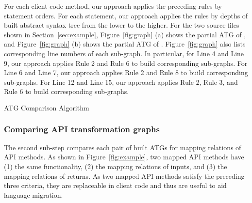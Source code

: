 For each client code method, our approach applies the preceding
rules by statement orders. For each statement, our approach applies
the rules by depths of built abstract syntax tree from the lower to
the higher. For the two source files shown in
Section~\ref{sec:example}, Figure~\ref{fig:graph} (a) shows the
partial ATG of , and Figure~\ref{fig:graph}
(b) shows the partial ATG of .
Figure~\ref{fig:graph} also lists corresponding line numbers of each
sub-graph. In particular, for Line 4 and Line 9, our approach
applies Rule 2 and Rule 6 to build corresponding sub-graphs. For
Line 6 and Line 7, our approach applies Rule 2 and Rule 8 to build
corresponding sub-graphs. For Line 12 and Line 15, our approach
applies Rule 2, Rule 3, and Rule 6 to build corresponding
sub-graphs.
\begin{algorithm}[t]
\begin{SmallOut}
\label{alg:mapATG} \dontprintsemicolon
 \end{SmallOut}
\caption{ATG Comparison Algorithm}
\end{algorithm}

\subsubsection{Comparing API transformation graphs} The
second sub-step compares each pair of built ATGs for mapping
relations of API methods. As shown in Figure~\ref{fig:example}, two
mapped API methods have (1) the same functionality, (2) the mapping
relations of inputs, and (3) the mapping relations of returns. As
two mapped API methods satisfy the preceding three criteria, they
are replaceable in client code and thus are useful to aid language
migration.

